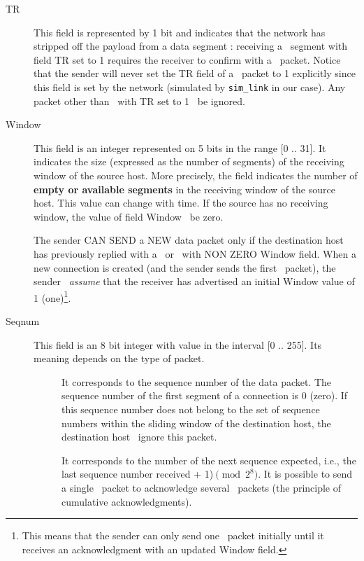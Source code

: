 \documentclass[12pt]{book}
\begin{document}
\begin{enumerate}[label=\arabic*.]
\begin{description}
    \item[TR] This field is represented by 1 bit and indicates that the network has stripped off the payload from a data segment \pdata:
    receiving a \pdata\ segment with field TR set to 1 requires the receiver to confirm with a \pnack\ packet. Notice that the sender will never set the TR field of a \pdata\ packet to 1 explicitly since this field is set by the network (simulated by \verb$sim_link$ in our case).
    Any packet other than \pdata\ with TR set to 1 \must\ be ignored.

    \item[Window] This field is an integer represented on 5 bits in the range [0 .. 31]. It indicates the size (expressed as the number of segments) of the receiving window of the source host. More precisely, the field indicates the number of \textbf{empty or available segments} in the receiving window of the source host. This value can change with time. If the source has no receiving window, the value of field Window \must\ be zero.

    The sender CAN SEND a NEW data packet only if the destination host has previously replied with a \pack\ or \pnack\ with NON ZERO Window field. When a new connection is created (and the sender sends the first \pdata\ packet), the sender \must\ \emph{assume} that the receiver has advertised an initial Window value of 1 (one)\footnote{This means that the sender can only send one \pdata\ packet initially until it receives an acknowledgment with an updated Window field.}.

    \item[Seqnum] This field is an 8 bit integer with value in the interval [0 .. 255]. Its meaning depends on the type of packet.

        \begin{description}
            \item[\pdata] It corresponds to the sequence number of the data packet. The sequence number of the first segment of a connection is 0 (zero). If this sequence number does not belong to the set of sequence numbers within the sliding window of the destination host, the destination host \must\ ignore this packet.

            \item[\pack] It corresponds to the number of the next sequence expected, i.e., the last sequence number received + 1)$\pmod {2^8}$. It is possible to send a single \pack\ packet to acknowledge several \pdata\ packets (the principle of cumulative acknowledgments).


\end{description}
\end{description}
\end{enumerate}
\end{document}
